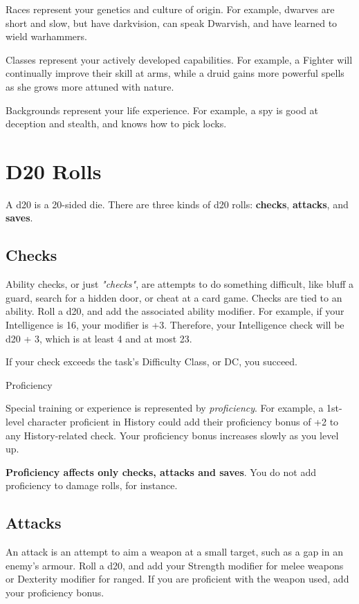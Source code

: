 \documentclass[letterpaper,twocolumn,openany,nodeprecatedcode,bg=print]{dndbook}
\begin{document}
Races represent your genetics and culture of origin. For example, dwarves are short and slow, but have darkvision, can speak Dwarvish, and have learned to wield warhammers. 

Classes represent your actively developed capabilities. For example, a Fighter will continually improve their skill at arms, while a druid gains more powerful spells as she grows more attuned with nature. 

Backgrounds represent your life experience. For example, a spy is good at deception and stealth, and knows how to pick locks. 


\newpage
\section{D20 Rolls}

A d20 is a 20-sided die. There are three kinds of d20 rolls: \textbf{checks}, \textbf{attacks}, and \textbf{saves}.

\subsection{Checks}
Ability checks, or just \textit{"checks"}, are attempts to do something difficult, like bluff a guard, search for a hidden door, or cheat at a card game. Checks are tied to an ability. Roll a d20, and add the associated ability modifier. For example, if your Intelligence is 16, your modifier is +3. Therefore, your Intelligence check will be d20 + 3, which is at least 4 and at most 23.

If your check exceeds the task's Difficulty Class, or DC, you succeed.

\begin{DndComment}{Proficiency}

\noindent Special training or experience is represented by \textit{proficiency}. For example, a 1st-level character proficient in History could add their proficiency bonus of +2 to any History-related check. Your proficiency bonus increases slowly as you level up.

\textbf{Proficiency affects only checks, attacks and saves}. You do not add proficiency to damage rolls, for instance.

\end{DndComment}

\subsection{Attacks}
An attack is an attempt to aim a weapon at a small target, such as a gap in an enemy's armour. Roll a d20, and add your Strength modifier for melee weapons or Dexterity modifier for ranged. If you are proficient with the weapon used, add your proficiency bonus.
\end{document}
